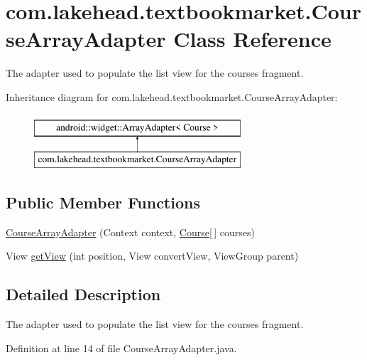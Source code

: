 \hypertarget{classcom_1_1lakehead_1_1textbookmarket_1_1_course_array_adapter}{\section{com.\-lakehead.\-textbookmarket.\-Course\-Array\-Adapter Class Reference}
\label{classcom_1_1lakehead_1_1textbookmarket_1_1_course_array_adapter}
}


The adapter used to populate the list view for the courses fragment.  


Inheritance diagram for com.\-lakehead.\-textbookmarket.\-Course\-Array\-Adapter\-:\begin{figure}[H]
\begin{center}
\leavevmode
\includegraphics[height=2.000000cm]{classcom_1_1lakehead_1_1textbookmarket_1_1_course_array_adapter}
\end{center}
\end{figure}
\subsection*{Public Member Functions}
\begin{DoxyCompactItemize}
\item 
\hyperlink{classcom_1_1lakehead_1_1textbookmarket_1_1_course_array_adapter_a47b1cfd1a796d8cf843dca87b0f2d2af}{Course\-Array\-Adapter} (Context context, \hyperlink{classcom_1_1lakehead_1_1textbookmarket_1_1_course}{Course}\mbox{[}$\,$\mbox{]} courses)
\item 
View \hyperlink{classcom_1_1lakehead_1_1textbookmarket_1_1_course_array_adapter_a2f140f8097c19e77ad197d3c8958e604}{get\-View} (int position, View convert\-View, View\-Group parent)
\end{DoxyCompactItemize}


\subsection{Detailed Description}
The adapter used to populate the list view for the courses fragment. 

Definition at line 14 of file Course\-Array\-Adapter.\-java.



